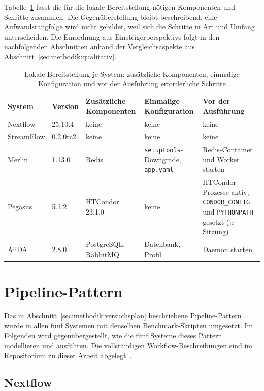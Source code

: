 Tabelle~\ref{tab:lokal:dienste} fasst die für die lokale
Bereitstellung nötigen Komponenten und Schritte zusammen. Die
Gegenüberstellung bleibt beschreibend, eine Aufwandsrangfolge wird
nicht gebildet, weil sich die Schritte in Art und Umfang
unterscheiden. Die Einordnung aus Einsteigerperspektive folgt in den
nachfolgenden Abschnitten anhand der Vergleichsaspekte aus
Abschnitt~\ref{sec:methodik:qualitativ}.

\begin{table}[ht]
  \caption{Lokale Bereitstellung je System: zusätzliche Komponenten, einmalige Konfiguration und vor der Ausführung erforderliche Schritte}
  \label{tab:lokal:dienste}
  \centering
  \footnotesize
  \renewcommand{\arraystretch}{1.3}
  \begin{tabular}{l l p{2.6cm} p{3.0cm} p{3.4cm}}
    \hline
    \textbf{System} & \textbf{Version} & \textbf{Zusätzliche Komponenten} & \textbf{Einmalige Konfiguration} & \textbf{Vor der Ausführung} \\
    \hline
    Nextflow   & 25.10.4  & keine & keine & keine \\
    StreamFlow & 0.2.0rc2 & keine & keine & keine \\
    Merlin     & 1.13.0   & Redis & \texttt{setuptools}-Downgrade, \texttt{app.yaml} & Redis-Container und Worker starten \\
    Pegasus    & 5.1.2    & HTCondor 23.1.0 & keine & HTCondor-Prozesse aktiv, \texttt{CONDOR\_CONFIG} und \texttt{PYTHONPATH} gesetzt (je Sitzung) \\
    AiiDA      & 2.8.0    & PostgreSQL, RabbitMQ & Datenbank, Profil & Daemon starten \\
    \hline
  \end{tabular}
\end{table}

\section{Pipeline-Pattern}
\label{sec:lokal:pipeline}

Das in Abschnitt~\ref{sec:methodik:versuchsplan} beschriebene
Pipeline-Pattern wurde in allen fünf Systemen mit denselben
Benchmark-Skripten umgesetzt. Im Folgenden wird gegenübergestellt,
wie die fünf Systeme dieses Pattern modellieren und ausführen. Die
vollständigen Workflow-Beschreibungen sind im Repositorium zu
dieser Arbeit abgelegt~\cite{barepo}.

\subsection{Nextflow}
\label{sec:lokal:pipeline:nextflow}

